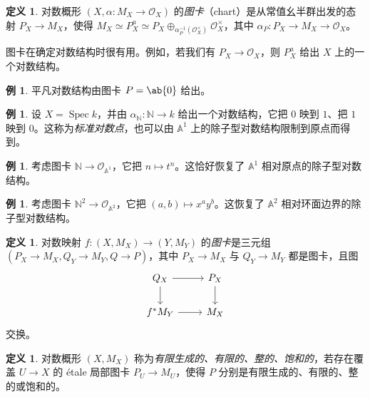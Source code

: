 \documentclass{amsart}
\theoremstyle{definition}
\newtheorem{defn}[thm]{定义}
\newtheorem{exm}[thm]{例}
\theoremstyle{remark}
\theoremstyle{plain}
\theoremstyle{definition}
\theoremstyle{remark}
\newcommand{\A}{\mathbb{A}}
\newcommand{\N}{\mathbb{N}}
\newcommand{\mc}[1]{\mathcal{#1}}
\newcommand{\1}{\mathbf{1}}
\newcommand{\2}{\mathbf{2}}
\newcommand{\3}{\mathbf{3}}
\DeclareMathOperator{\Spec}{Spec}
\begin{document}
\begin{defn}
    对数概形 \((X, \alpha \colon M_X \to \mc{O}_X)\) 的\textit{图卡}（chart）是从常值幺半群出发的态射 \(P_X \to M_X\)，使得 \(M_X \simeq P_X^a \simeq P_X \oplus_{\alpha_P^{-1}(\mc{O}_X^{\times})} \mc{O}_X^{\times}\)，其中 \(\alpha_P \colon P_X \to M_X \to \mc{O}_X\)。
\end{defn}

图卡在确定对数结构时很有用。例如，若我们有 \(P_X \to \mc{O}_X\)，则 \(P_X^a\) 给出 \(X\) 上的一个对数结构。

\begin{exm}
    平凡对数结构由图卡 \(P = \ab\{0\}\) 给出。
\end{exm}

\begin{exm}
    设 \(X = \Spec k\)，并由 \(\alpha_{\N} \colon \N \to k\) 给出一个对数结构，它把 \(0\) 映到 \(1\)、把 \(1\) 映到 \(0\)。这称为\textit{标准对数点}，也可以由 \(\A^1\) 上的除子型对数结构限制到原点而得到。
\end{exm}

\begin{exm}
    考虑图卡 \(\N \to \mc{O}_{\A^1}\)，它把 \(n \mapsto t^n\)。这恰好恢复了 \(\A^1\) 相对原点的除子型对数结构。
\end{exm}

\begin{exm}
    考虑图卡 \(\N^2 \to \mc{O}_{\A^2}\)，它把 \((a,b) \mapsto x^a y^b\)。这恢复了 \(\A^2\) 相对环面边界的除子型对数结构。
\end{exm}

\begin{defn}
    对数映射 \(f \colon (X, M_X) \to (Y, M_Y)\) 的\textit{图卡}是三元组 \((P_X\to M_X, Q_Y \to M_Y, Q \to P)\)，其中 \(P_X \to M_X\) 与 \(Q_Y \to M_Y\) 都是图卡，且图
    \begin{equation*}
    \begin{tikzcd}
        Q_X \ar{r} \ar{d} & P_X \ar{d} \\
        f^* M_Y \ar{r} & M_X
    \end{tikzcd}
    \end{equation*}
    交换。
\end{defn}

\begin{defn}
    对数概形 \((X, M_X)\) 称为\textit{有限生成的、有限的、整的、饱和的}，若存在覆盖 \(U \to X\) 的 \'etale 局部图卡 \(P_U \to M_U\)，使得 \(P\) 分别是有限生成的、有限的、整的或饱和的。
\end{defn}
\end{document}
